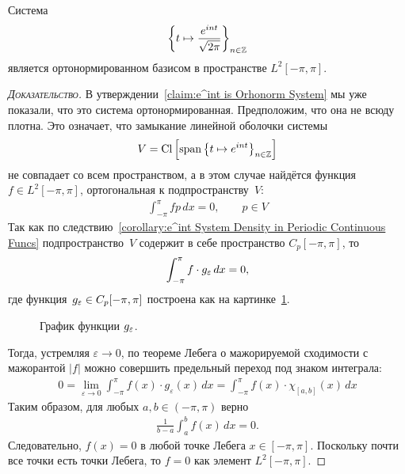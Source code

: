 \documentclass[../complex-analysis.tex]{subfiles}
\begin{document}
\begin{crly}
 \label{corollary:e^int is ONB in L^2 space}
 Система
 \begin{align*}
  \left\{t \mapsto \frac{e^{int}}{\sqrt{2\pi}} \right\}_{n \in \mathbb{Z}}
 \end{align*} является ортонормированном базисом в пространстве $ L^{2}[-\pi,\pi] $.
\end{crly}
\begin{proof}[\normalfont\textsc{Доказательство}]
 В утверждении~\ref{claim:e^int is Orhonorm System} мы уже показали, что это система ортонормированная. Предположим, что она не всюду плотна. Это означает, что замыкание линейной оболочки системы
 \begin{align*}
  V = \mathop{\mathrm{Cl}} \left[ \mathop{\mathrm{span}} \left\{ t \mapsto e^{int} \right\}_{n \in \mathbb{Z}} \right]
 \end{align*}
 не совпадает со всем пространством, а в этом случае найдётся функция~$ f \in L^{2}[-\pi,\pi] $, ортогональная к подпространству~$ V $:
 \begin{align*}
  \int_{-\pi}^{\pi} f p \,dx = 0, \qquad p \in V
 \end{align*} Так как по следствию~\ref{corollary:e^int System Density in Periodic Continuous Funcs} подпространство~$ V $ содержит в себе пространство $ C_p [-\pi,\pi] $, то
 \begin{align*}
  \int_{-\pi}^{\pi} f \cdot g_\varepsilon \, dx = 0,
 \end{align*} где функция~$ g_\varepsilon \in C_p [-\pi,\pi] $ построена как на картинке~\ref{fig:eint_full_in_l2_g_eps}.

 \begin{figure}[ht]
  \centering
  \caption{График функции $g_{\varepsilon}$. }
  \label{fig:eint_full_in_l2_g_eps}
 \end{figure}

 Тогда, устремляя $ \varepsilon \to 0 $, по теореме Лебега о мажорируемой сходимости с мажорантой $ \left| f \right| $ можно совершить предельный переход под знаком интеграла:
 \begin{align*}
  0 = \lim_{ \varepsilon \to 0 } \int_{-\pi}^{\pi} f(x) \cdot g_{\varepsilon}(x) \,dx = \int_{-\pi}^{\pi} f(x) \cdot \chi_{[a,b]}(x) \,dx
 \end{align*} Таким образом, для любых $ a,b \in (-\pi,\pi) $ верно
 \begin{align*}
  \frac{1}{b-a} \int_a^{b} f(x)\,dx = 0.
 \end{align*} Следовательно, $ f(x) = 0 $ в любой точке Лебега $ x \in [-\pi,\pi] $. Поскольку почти все точки есть точки Лебега, то $ f = 0 $ как элемент $ L^{2}[-\pi,\pi] $.
\end{proof}
\end{document}
